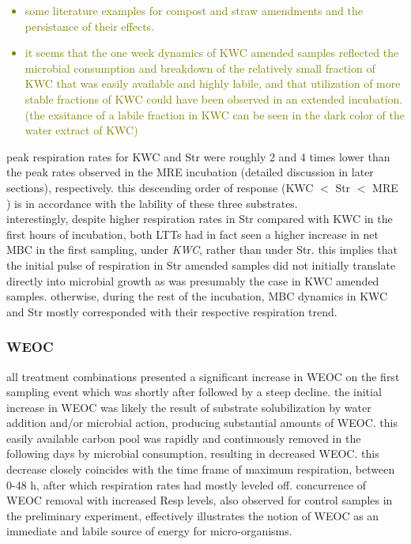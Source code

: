 \documentclass[12pt]{report}
\newcommand{\myGreen}[1]{\textcolor{olive}{#1}} %
\begin{document}
\myGreen{\begin{itemize}
		\item some literature examples for compost and straw amendments and the persistance of their effects.
		\item it seems that the one week dynamics of KWC amended samples reflected the microbial consumption and breakdown of the relatively small fraction of KWC that was easily available and highly labile, and that utilization of more stable fractions of KWC could have been observed in an extended incubation. (the exsitance of a labile fraction in KWC can be seen in the dark color of the water extract of KWC)
\end{itemize}}
peak respiration rates for KWC and Str were roughly 2 and 4 times lower than the peak rates observed in the MRE incubation (detailed discussion in later sections), respectively. this descending order of response (KWC $ < $ Str $ < $ MRE ) is in accordance with the lability of these three substrates.\\
interestingly, despite higher respiration rates in Str compared with KWC in the first hours of incubation, both LTTs had in fact seen a higher increase in net MBC in the first sampling, under \emph{KWC}, rather than under Str. this implies that the initial pulse of respiration in Str amended samples did not initially translate directly into microbial growth as was presumably the case in KWC amended samples. otherwise, during the rest of the incubation, MBC dynamics in KWC and Str mostly corresponded with their respective respiration trend. 

\subsubsection{WEOC}

all treatment combinations presented a significant increase in WEOC on the first sampling event which was shortly after followed by a steep decline. the initial increase in WEOC was likely the result of substrate solubilization by water addition and/or microbial action, producing substantial amounts of WEOC. this easily available carbon pool was rapidly and continuously removed in the following days by microbial consumption, resulting in decreased WEOC. this decrease closely coincides with the time frame of maximum respiration, between 0-48 h, after which respiration rates had mostly leveled off. concurrence of WEOC removal with increased Resp levels, also observed for control samples in the preliminary experiment, effectively illustrates the  notion of WEOC as an immediate and labile source of energy for micro-organisms.\\
\end{document}
